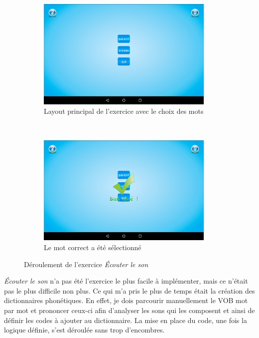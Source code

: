 \begin{figure}[H]
\begin{subfigure}[t]{8.5cm}
\includegraphics[width=8.5cm]{img/son-start.png}
\caption{Layout principal de l'exercice avec le choix des mots}
\label{son1}
\end{subfigure}
~
\begin{subfigure}[t]{8.5cm}
\includegraphics[width=8.5cm]{img/son-ok.png}
\caption{Le mot correct a été sélectionné}
\label{son2}
\end{subfigure}
\caption{Déroulement de l'exercice \textit{Écouter le son}}
\end{figure}

\textit{Écouter le son} n'a pas été l'exercice le plus facile à implémenter, mais ce n'était pas le plus difficile non plus. Ce qui m'a pris le plus de temps était la création des dictionnaires phonétiques. En effet, je dois parcourir manuellement le VOB mot par mot et prononcer ceux-ci afin d'analyser les sons qui les composent et ainsi de définir les codes à ajouter au dictionnaire. La mise en place du code, une fois la logique définie, s'est déroulée sans trop d'encombres.

